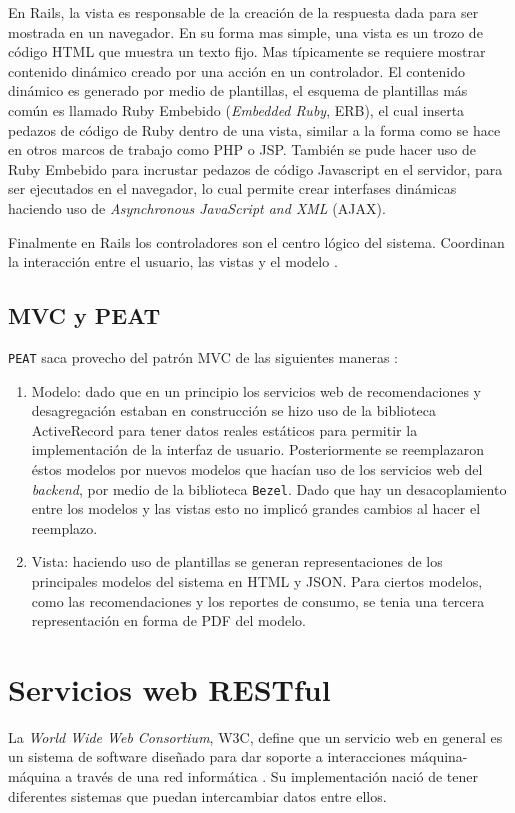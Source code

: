 En Rails, la vista es responsable de la creación de la respuesta dada para
ser mostrada en un navegador. En su forma mas simple, una
vista es un trozo de código HTML que muestra un texto fijo. Mas típicamente
se requiere mostrar contenido dinámico creado por una acción en un controlador.
El contenido dinámico es generado por medio de plantillas, el esquema
de plantillas más común es llamado Ruby Embebido (\textit{Embedded Ruby}, ERB),
el cual inserta pedazos de código de Ruby dentro de una vista, similar a la forma
como se hace en otros marcos de trabajo como PHP o JSP. También se pude hacer uso de
Ruby Embebido para incrustar pedazos de código Javascript en el servidor,
para ser ejecutados en el navegador, lo cual permite crear interfases
dinámicas haciendo uso de \textit{Asynchronous JavaScript and XML} (AJAX).

Finalmente en Rails los controladores son el centro lógico del sistema. Coordinan
la interacción entre el usuario, las vistas y el modelo
\cite{15_agile_hansson}.

\subsection{MVC y PEAT}
\texttt{PEAT} saca provecho del patrón MVC de las siguientes maneras \cite{15_agile_hansson}:

\begin{enumerate}
\item Modelo: dado que en un principio los servicios web de recomendaciones y
  desagregación estaban en construcción se hizo uso de la biblioteca ActiveRecord
  para tener datos reales estáticos para permitir la implementación
  de la interfaz de usuario. Posteriormente se reemplazaron éstos modelos
  por nuevos modelos que hacían uso de los servicios web del \textit{backend},
  por medio de la biblioteca \texttt{Bezel}. Dado que hay un desacoplamiento
  entre los modelos y las vistas esto no implicó grandes cambios al hacer el
  reemplazo.
\item Vista: haciendo uso de plantillas se generan representaciones de los
  principales modelos del sistema en HTML y JSON. Para ciertos modelos, como
  las recomendaciones y los reportes de consumo, se tenia una tercera
  representación en forma de PDF del modelo.
\end{enumerate}

\section{Servicios web RESTful}
La \textit{World Wide Web Consortium}, W3C, define que un servicio web
en general es un sistema de software diseñado para dar soporte a interacciones
máquina-máquina a través de una red informática \cite{17_w3c_webservice}.
Su implementación nació de tener diferentes sistemas que puedan intercambiar
datos entre ellos.

